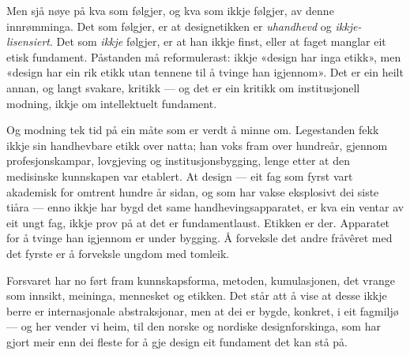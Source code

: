 Men sjå nøye på kva som følgjer, og kva som ikkje følgjer, av denne innrømminga. Det som følgjer, er at designetikken er \emph{uhandhevd} og \emph{ikkje-lisensiert}. Det som \emph{ikkje} følgjer, er at han ikkje finst, eller at faget manglar eit etisk fundament. Påstanden må reformulerast: ikkje «design har inga etikk», men «design har ein rik etikk utan tennene til å tvinge han igjennom». Det er ein heilt annan, og langt svakare, kritikk — og det er ein kritikk om institusjonell modning, ikkje om intellektuelt fundament.

Og modning tek tid på ein måte som er verdt å minne om. Legestanden fekk ikkje sin handhevbare etikk over natta; han voks fram over hundreår, gjennom profesjonskampar, lovgjeving og institusjonsbygging, lenge etter at den medisinske kunnskapen var etablert. At design — eit fag som fyrst vart akademisk for omtrent hundre år sidan, og som har vakse eksplosivt dei siste tiåra — enno ikkje har bygd det same handhevingsapparatet, er kva ein ventar av eit ungt fag, ikkje prov på at det er fundamentlaust. Etikken er der. Apparatet for å tvinge han igjennom er under bygging. Å forveksle det andre fråvêret med det fyrste er å forveksle ungdom med tomleik.

\vignett

Forsvaret har no ført fram kunnskapsforma, metoden, kumulasjonen, det vrange som innsikt, meininga, mennesket og etikken. Det står att å vise at desse ikkje berre er internasjonale abstraksjonar, men at dei er bygde, konkret, i eit fagmiljø — og her vender vi heim, til den norske og nordiske designforskinga, som har gjort meir enn dei fleste for å gje design eit fundament det kan stå på.


